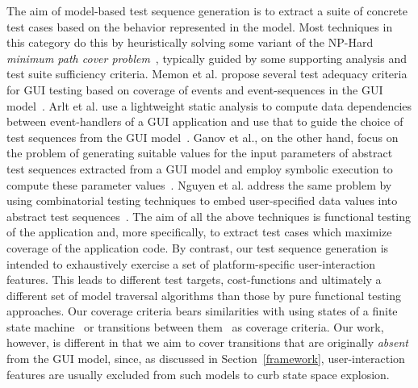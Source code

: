 The aim of model-based test sequence generation is to extract a suite
of concrete test cases based on the behavior represented in the
model. Most techniques in this category do this by heuristically
solving some variant of the NP-Hard \textit{minimum path cover
  problem}~\cite{PathCover:NtafosH79}, typically guided by some
supporting analysis and test suite sufficiency criteria. Memon et
al. propose several test adequacy criteria for GUI testing based on
coverage of events and event-sequences in the GUI
model~\cite{memon2001coverage}. Arlt et al. use a lightweight static
analysis to compute data dependencies between event-handlers of a GUI
application and use that to guide the choice of test sequences from
the GUI model~\cite{Arlt:2012:ISSRE}. Ganov et al., on the other hand,
focus on the problem of generating suitable values for the input
parameters of abstract test sequences extracted from a GUI model and
employ symbolic execution to compute these parameter
values~\cite{Ganov:2009:ICFEM}. Nguyen et al.  address the same
problem by using combinatorial testing techniques to embed
user-specified data values into abstract test
sequences~\cite{Nguyen:2012:ISSTA}. The aim of all the above
techniques is functional testing of the application and, more
specifically, to extract test cases which maximize coverage of the
application code. By contrast, our test sequence generation is
intended to exhaustively exercise a set of platform-specific
user-interaction features. This leads to different test targets,
cost-functions and ultimately a different set of model traversal
algorithms than those by pure functional testing approaches.
Our coverage criteria bears similarities with using states of a finite state machine~\cite{shehady1997method} or transitions between them~\cite{belli2001finite} as coverage criteria. Our work, however, is different in that we aim to cover transitions that are originally \emph{absent} from the GUI model, since, as discussed in Section~\ref{framework}, user-interaction features are usually excluded from such models to curb state space explosion.

 

